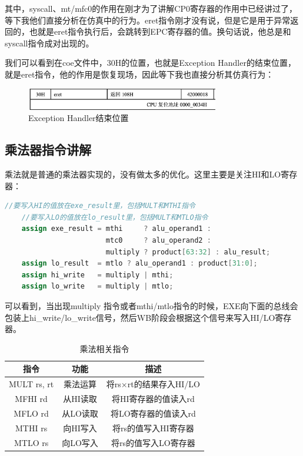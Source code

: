 \documentclass[a4paper]{article}
\begin{document}
其中，syscall、mt/mfc0的作用在刚才为了讲解CP0寄存器的作用中已经讲过了，等下我他们直接分析在仿真中的行为。eret指令刚才没有说，但是它是用于异常返回的，也就是eret指令执行后，会跳转到EPC寄存器的值。换句话说，他总是和syscall指令成对出现的。

我们可以看到在coe文件中，30H的位置，也就是Exception Handler的结束位置，就是eret指令，他的作用是恢复现场，因此等下我也直接分析其仿真行为：

\begin{figure}[H]
    \centering
    \includegraphics[width=0.75\textwidth]{img/复现流水线/handlerFinal.png}
    \caption{Exception Handler结束位置}
\end{figure}


\subsection{乘法器指令讲解}

乘法就是普通的乘法器实现的，没有做太多的优化。这里主要是关注HI和LO寄存器：

\begin{lstlisting}[language=Verilog, caption=乘法结果分配]
    //要写入HI的值放在exe_result里，包括MULT和MTHI指令
    //要写入LO的值放在lo_result里，包括MULT和MTLO指令
    assign exe_result = mthi     ? alu_operand1 :
                        mtc0     ? alu_operand2 : 
                        multiply ? product[63:32] : alu_result;
    assign lo_result  = mtlo ? alu_operand1 : product[31:0];
    assign hi_write   = multiply | mthi;
    assign lo_write   = multiply | mtlo;
    \end{lstlisting}

    可以看到，当出现multiply 指令或者mthi/mtlo指令的时候，EXE向下面的总线会包装上hi\_write/lo\_write信号，然后WB阶段会根据这个信号来写入HI/LO寄存器。

    \begin{table}[H]
        \centering
        \caption{乘法相关指令}
        \begin{tabular}{|c|c|c|}
        \hline
        \textbf{指令} & \textbf{功能} & \textbf{描述} \\
        \hline
        MULT rs, rt & 乘法运算 & 将rs×rt的结果存入HI/LO \\
        \hline
        MFHI rd & 从HI读取 & 将HI寄存器的值读入rd \\
        \hline
        MFLO rd & 从LO读取 & 将LO寄存器的值读入rd \\
        \hline
        MTHI rs & 向HI写入 & 将rs的值写入HI寄存器 \\
        \hline
        MTLO rs & 向LO写入 & 将rs的值写入LO寄存器 \\
        \hline
        \end{tabular}
    \end{table}
\end{document}
